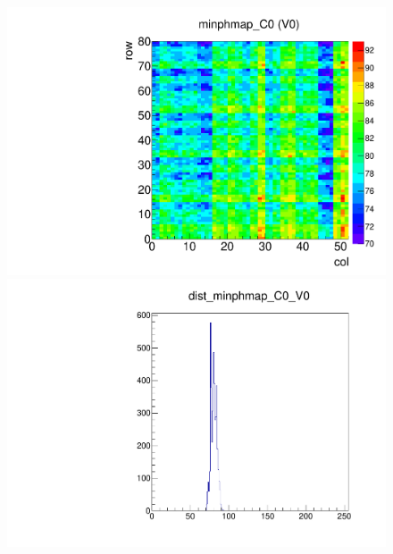 \begin{figure}[!Hp]
\centering
\begin{minipage}{0.45\textwidth}
  \includegraphics[width=1.0\textwidth]{figures/phopt_minphmap.pdf}
  \caption{}
  \label{fig:phopt_minphmap}
\end{minipage}
\hspace{0.3cm}
\begin{minipage}{0.45\textwidth}
  \includegraphics[width=1.0\textwidth]{figures/phopt_dist_minphmap.pdf}
  \caption{}
  \label{fig:phopt_dist_minphmap}
\end{minipage}
\end{figure}

